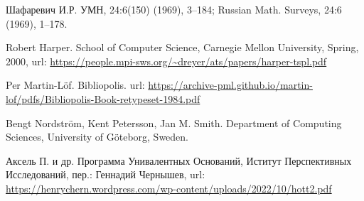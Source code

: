 \documentclass[openany]{book}
\theoremstyle{plain}
\theoremstyle{definition}
\begin{document}
\begin{thebibliography}{2}

    Шафаревич И.Р.
    \newblock УМН, 24:6(150) (1969), 3–184; Russian Math. Surveys, 24:6 (1969), 1–178.

    Robert Harper.
    \newblock School of Computer Science, Carnegie Mellon University, Spring, 2000,
    \newblock url: \url{https://people.mpi-sws.org/~dreyer/ats/papers/harper-tspl.pdf}

    Per Martin-L\"{o}f.
    \newblock Bibliopolis.
    \newblock url: \url{https://archive-pml.github.io/martin-lof/pdfs/Bibliopolis-Book-retypeset-1984.pdf}

    Bengt Nordstr\"{o}m, Kent Petersson, Jan M. Smith.
    \newblock Department of Computing Sciences, University of G\"{o}teborg, Sweden.

    \bibitem{}
    Аксель П. и др.
    \newblock Программа Унивалентных Оснований, Иститут Перспективных Исследований, пер.: Геннадий Чернышев,
    \newblock url: \url{https://henrychern.wordpress.com/wp-content/uploads/2022/10/hott2.pdf}

\end{thebibliography}
\end{document}
